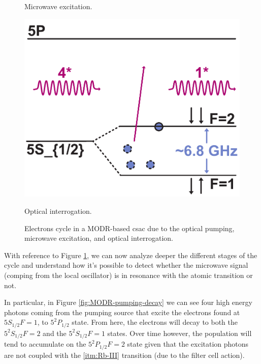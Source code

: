 \begin{figure}[H]
\begin{minipage}[t]{0.3\linewidth}
        \caption{Microwave excitation.}
        \label{fig:MODR-microwave}
    \end{minipage}
    \hfill
    \begin{minipage}[t]{0.3\linewidth}
        \centering
        \includegraphics[width=\linewidth]{pdf/MODR/interrogation.pdf}
        \caption{Optical interrogation.}
        \label{fig:MODR-interrogation}
    \end{minipage}

    \caption{Electrons cycle in a MODR-based \acrshort{csac} due to the optical pumping, microwave excitation, and optical interrogation.}
    \label{fig:MODR-steps}
\end{figure}

With reference to Figure \ref{fig:MODR-steps}, we can now analyze deeper the different stages of the cycle and understand how it's possible to detect whether the microwave signal (comping from the local oscillator) is in resonance with the atomic transition or not.

In particular, in Figure \ref{fig:MODR-pumping-decay} we can see four high energy photons coming from the pumping source that excite the electrons found at $5S_{1/2} F=1$, to $5^2P_{1/2}$ state.
From here, the electrons will decay to both the $5^2S_{1/2} F=2$ and the $5^2S_{1/2} F=1$ states.
Over time however, the population will tend to accumulate on the $5^2P_{1/2} F=2$ state given that the excitation photons are not coupled with the \ref{itm:Rb-III} transition (due to the filter cell action).


